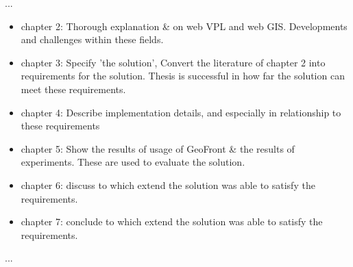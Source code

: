 ...
\begin{itemize}[\m{->}]
  \item chapter 2: Thorough explanation \& on web VPL and web GIS. 
  \subitem Developments and challenges within these fields.
  \item chapter 3: Specify 'the solution', Convert the literature of chapter 2 into requirements for the solution. 
  \subitem Thesis is successful in how far the solution can meet these requirements. 
  \item chapter 4: Describe implementation details, and especially in relationship to these requirements
  \item chapter 5: Show the results of usage of GeoFront \& the results of experiments.
  \subitem These are used to evaluate the solution.
  \item chapter 6: discuss to which extend the solution was able to satisfy the requirements.
  \item chapter 7: conclude to which extend the solution was able to satisfy the requirements.
\end{itemize}

...

